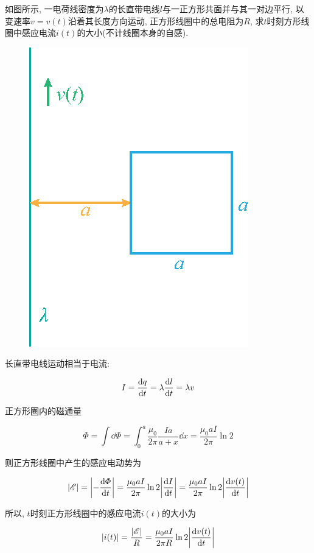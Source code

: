 \begin{example}
	如图所示, 一电荷线密度为$\lambda$的长直带电线$l$与一正方形共面并与其一对边平行, 以变速率$v = v(t)$沿着其长度方向运动, 正方形线圈中的总电阻为$R$, 求$t$时刻方形线圈中感应电流$i(t)$的大小(不计线圈本身的自感).
	
	\begin{figure}[H]
		\centering
		\includegraphics[scale=1.0]{C9-fig4.eps}
	\end{figure}
	
	\begin{solution}
		
		长直带电线运动相当于电流: 
		
		\begin{equation*}
			I = \dv{q}{t} = \lambda \dv{l}{t} = \lambda v
		\end{equation*}
				
		正方形圈内的磁通量
		
		\begin{equation*}
			\varPhi = \int \dd{\varPhi} = \int_{0}^{a} \dfrac{\mu_0}{2 \pi} \dfrac{I a}{a+x} \dd{x} = \dfrac{\mu_0 a I}{2 \pi} \ln 2 
		\end{equation*}
		
		则正方形线圈中产生的感应电动势为
		
		\begin{equation*}
			\abs{\mathscr{E}} = \abs{-\dv{\varPhi}{t}} = \dfrac{\mu_0 a I}{2 \pi} \ln 2 \abs{\dv{I}{t}} = \dfrac{\mu_0 a I}{2 \pi} \ln 2 \abs{\dv{v(t)}{t}}
		\end{equation*}
		
		所以, $t$时刻正方形线圈中的感应电流$i(t)$的大小为
		
		\begin{equation*}
			\abs{i(t)} = \dfrac{\abs{\mathscr{E}}}{R} = \dfrac{\mu_0 a I}{2 \pi R} \ln 2 \abs{\dv{v(t)}{t}}
		\end{equation*}
		
	\end{solution}
	
\end{example}

